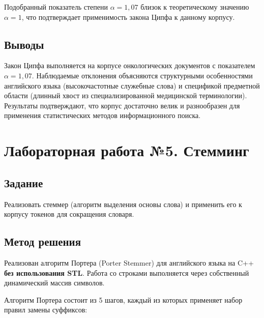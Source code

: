 \documentclass[a4paper,12pt]{article}
\begin{document}
Подобранный показатель степени $\alpha = 1{,}07$ близок к теоретическому значению $\alpha = 1$, что подтверждает применимость закона Ципфа к данному корпусу.

\subsection{Выводы}

Закон Ципфа выполняется на корпусе онкологических документов с показателем $\alpha = 1{,}07$. Наблюдаемые отклонения объясняются структурными особенностями английского языка (высокочастотные служебные слова) и спецификой предметной области (длинный хвост из специализированной медицинской терминологии). Результаты подтверждают, что корпус достаточно велик и разнообразен для применения статистических методов информационного поиска.

\newpage

\section{Лабораторная работа №5. Стемминг}

\subsection{Задание}

Реализовать стеммер (алгоритм выделения основы слова) и применить его к корпусу токенов для сокращения словаря.

\subsection{Метод решения}

Реализован алгоритм Портера (Porter Stemmer) для английского языка на C++ \textbf{без использования STL}. Работа со строками выполняется через собственный динамический массив символов.

Алгоритм Портера состоит из 5 шагов, каждый из которых применяет набор правил замены суффиксов:
\end{document}
